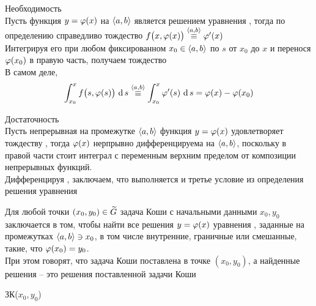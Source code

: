 \begin{iproof}
	\item Необходимость \\
	Пусть функция $ y = \vphi(x) $ на $ \braket{a, b} $ является решением уравнения , тогда по определению справедливо тождество $ f \big( x, \vphi(x) \big) \overset{\braket{a, b}}\equiv \vphi'(x) $ \\
	Интегрируя его при любом фиксированном $ x_0 \in \braket{a, b} $ по $ s $ от $ x_0 $ до $ x $ и перенося $ \vphi(x_0) $ в правую часть, получаем тождество  \\
	В самом деле,
	$$ \dint[s]{x_0}x{f \big( s, \vphi(s) \big)} \overset{\braket{a, b}}\equiv \dint[s]{x_0}x{\vphi'(s)} = \vphi(x) - \vphi(x_0) $$
	\item Достаточность \\
	Пусть непрерывная на промежутке $ \braket{a, b} $ функция $ y = \vphi(x) $ удовлетворяет тождеству , тогда $ \vphi(x) $ нерпрывно дифференцируема на $ \braket{a, b} $, поскольку в правой части  стоит интеграл с переменным верхним пределом от композиции непрерывных функций. \\
	Дифференцируя , заключаем, что выполняется и третье условие из определения решения уравнения 
\end{iproof}

\begin{problem}[Коши]
	Для любой точки $ (x_0, y_0) \in \vawe{G} $ задача Коши с начальными данными $ x_0, y_0 $ заключается в том, чтобы найти все решения $ y = \vphi(x) $ уравнения , заданные на промежутках $ \braket{a, b} \ni x_0 $, в том числе внутренние, граничные или смешанные, такие, что $ \vphi(x_0) = y_0 $. \\
	При этом говорят, что задача Коши поставлена в точке $ (x_0, y_0) $, а найденные решения -- это решения поставленной задачи Коши
\end{problem}

\begin{notation}
	ЗК($ x_0, y_0 $)
\end{notation}
